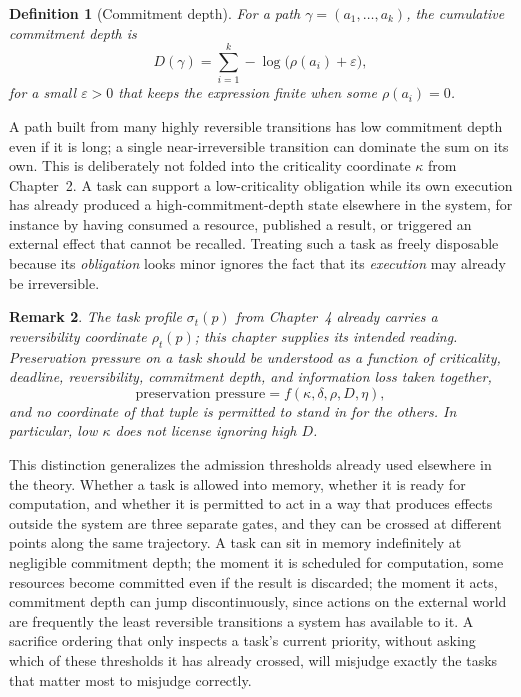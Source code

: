 \documentclass[11pt]{report}
\newtheorem{definition}{Definition}[chapter]
\newtheorem{remark}[definition]{Remark}
\begin{document}
\begin{definition}[Commitment depth]
For a path $\gamma = (a_1, \ldots, a_k)$, the cumulative commitment depth is
\[
D(\gamma) = \sum_{i=1}^k -\log\bigl(\rho(a_i) + \varepsilon\bigr),
\]
for a small $\varepsilon > 0$ that keeps the expression finite when some $\rho(a_i) = 0$.
\end{definition}

A path built from many highly reversible transitions has low commitment depth even if it is long; a single near-irreversible transition can dominate the sum on its own. This is deliberately not folded into the criticality coordinate $\kappa$ from Chapter~2. A task can support a low-criticality obligation while its own execution has already produced a high-commitment-depth state elsewhere in the system, for instance by having consumed a resource, published a result, or triggered an external effect that cannot be recalled. Treating such a task as freely disposable because its \emph{obligation} looks minor ignores the fact that its \emph{execution} may already be irreversible.

\begin{remark}
The task profile $\sigma_t(p)$ from Chapter~4 already carries a reversibility coordinate $\rho_t(p)$; this chapter supplies its intended reading. Preservation pressure on a task should be understood as a function of criticality, deadline, reversibility, commitment depth, and information loss taken together,
\[
\text{preservation pressure} = f(\kappa, \delta, \rho, D, \eta),
\]
and no coordinate of that tuple is permitted to stand in for the others. In particular, low $\kappa$ does not license ignoring high $D$.
\end{remark}

This distinction generalizes the admission thresholds already used elsewhere in the theory. Whether a task is allowed into memory, whether it is ready for computation, and whether it is permitted to act in a way that produces effects outside the system are three separate gates, and they can be crossed at different points along the same trajectory. A task can sit in memory indefinitely at negligible commitment depth; the moment it is scheduled for computation, some resources become committed even if the result is discarded; the moment it acts, commitment depth can jump discontinuously, since actions on the external world are frequently the least reversible transitions a system has available to it. A sacrifice ordering that only inspects a task's current priority, without asking which of these thresholds it has already crossed, will misjudge exactly the tasks that matter most to misjudge correctly.
\end{document}
